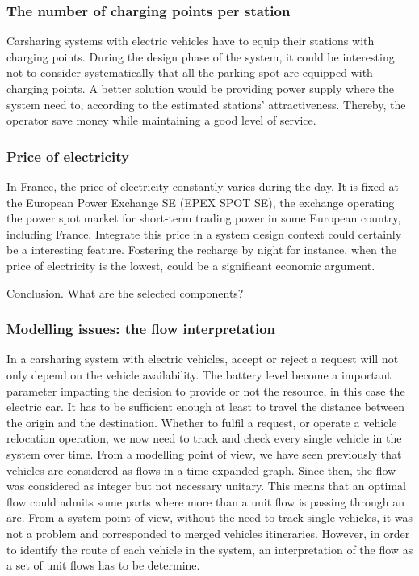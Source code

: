 \begin{bibunit}[ieeetr]
\subsubsection{The number of charging points per station}
Carsharing systems with electric vehicles have to equip their stations with charging points.
During the design phase of the system, it could be interesting not to consider systematically that all the parking spot are equipped with charging points. 
A better solution would be providing power supply where the system need to, according to the estimated stations' attractiveness.
Thereby, the operator save money while maintaining a good level of service.


\subsubsection{Price of electricity}
In France, the price of electricity constantly varies during the day.
It is fixed at the European Power Exchange SE (EPEX SPOT SE), the exchange operating the power spot market for short-term trading power in some European country, including France.
Integrate this price in a system design context could certainly be a interesting feature.
Fostering the recharge by night for instance, when the price of electricity is the lowest, could be a significant  economic argument.


\bigskip
Conclusion. What are the selected components?


\subsubsection{Modelling issues: the flow interpretation}
In a carsharing system with electric vehicles, accept or reject a request will not only depend on the vehicle availability.
The battery level become a important parameter impacting the decision to provide or not the resource, in this case the electric car.
It has to be sufficient enough at least to travel the distance between the origin and the destination.
Whether to fulfil a request, or operate a vehicle relocation operation, we now need to track and check every single vehicle in the system over time.
From a modelling point of view, we have seen previously that vehicles are considered as flows in a time expanded graph.
Since then, the flow was considered as integer but not necessary unitary.
This means that an optimal flow could admits some parts where more than a unit flow is passing through an arc.
From a system point of view, without the need to track single vehicles, it was not a problem and corresponded to merged vehicles itineraries.
However, in order to identify the route of each vehicle in the system, an interpretation of the flow as a set of unit flows has to be determine.


\end{bibunit}
